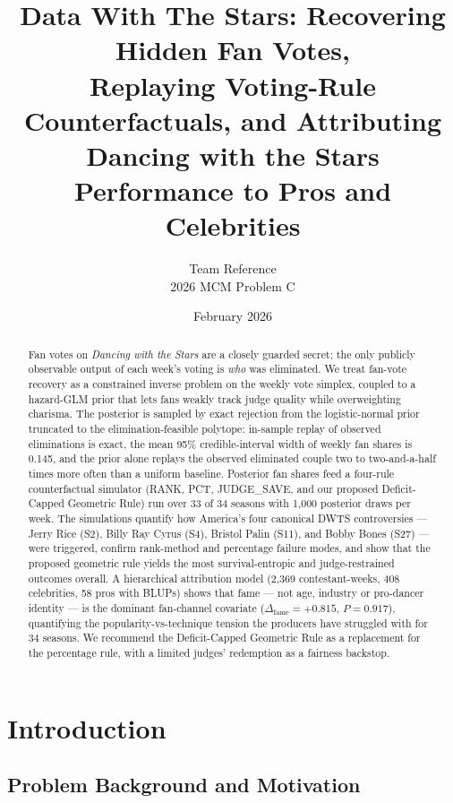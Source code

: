 \documentclass[11pt]{article}
\title{Data With The Stars: Recovering Hidden Fan Votes,\\
Replaying Voting-Rule Counterfactuals, and Attributing\\
Dancing with the Stars Performance to Pros and Celebrities}
\author{Team Reference \\ \small 2026 MCM Problem C}
\date{\small February 2026}
\begin{document}
\maketitle

\begin{abstract}
Fan votes on \emph{Dancing with the Stars} are a closely guarded secret;
the only publicly observable output of each week's voting is \emph{who}
was eliminated. We treat fan-vote recovery as a constrained inverse
problem on the weekly vote simplex, coupled to a hazard-GLM prior that
lets fans weakly track judge quality while overweighting charisma. The
posterior is sampled by exact rejection from the logistic-normal prior
truncated to the elimination-feasible polytope: in-sample replay of
observed eliminations is exact, the mean 95\% credible-interval width of
weekly fan shares is 0.145, and the prior alone replays the observed
eliminated couple two to two-and-a-half times more often than a uniform
baseline. Posterior fan shares feed a four-rule counterfactual simulator
(RANK, PCT, JUDGE\_SAVE, and our proposed Deficit-Capped Geometric Rule)
run over 33 of 34 seasons with 1,000 posterior draws per week. The
simulations quantify how America's four canonical DWTS controversies ---
Jerry Rice (S2), Billy Ray Cyrus (S4), Bristol Palin (S11), and Bobby
Bones (S27) --- were triggered, confirm rank-method and percentage
failure modes, and show that the proposed geometric rule yields the most
survival-entropic and judge-restrained outcomes overall. A hierarchical
attribution model (2,369 contestant-weeks, 408 celebrities, 58 pros with
BLUPs) shows that fame --- not age, industry or pro-dancer identity ---
is the dominant fan-channel covariate ($\Delta_{\text{fame}} = +0.815$,
$P = 0.917$), quantifying the popularity-vs-technique tension the
producers have struggled with for 34 seasons. We recommend the
Deficit-Capped Geometric Rule as a replacement for the percentage rule,
with a limited judges' redemption as a fairness backstop.
\end{abstract}

\tableofcontents
\newpage

\section{Introduction}

\subsection{Problem Background and Motivation}
\end{document}
